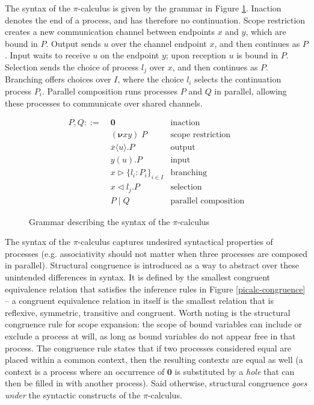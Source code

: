 \documentclass{mproj}
\newcommand{\PO}{\mathbf{0}}
\newcommand{\comp}[2]{#1 \mid #2}
\newcommand{\new}[2]{(\boldsymbol{\nu} #1 #2) \;}
\newcommand{\cout}[2]{\overline{#1}\langle#2\rangle.}
\newcommand{\cin}[2]{#1(#2).}
\newcommand{\select}[2]{#1\triangleleft#2.}
\newcommand{\branch}[2]{#1\triangleright#2}
\newcommand{\picalc}{$\pi$-calculus}
\begin{document}
The syntax of the \picalc{} is given by the grammar in Figure \ref{picalc-syntax}. Inaction denotes the end of a process, and has therefore no continuation. Scope restriction creates a new communication channel between endpoints $x$ and $y$, which are bound in $P$. Output sends $u$ over the channel endpoint $x$, and then continues as $P$. Input waits to receive $u$ on the endpoint $y$; upon reception $u$ is bound in $P$. Selection sends the choice of process $l_j$ over $x$, and then continues as $P$. Branching offers choices over $I$, where the choice $l_i$ selects the continuation process $P_i$. Parallel composition runs processes $P$ and $Q$ in parallel, allowing these processes to communicate over shared channels.

\begin{figure}[H]
    \begin{align*}
    P,Q ::= \; &\PO                      & \text{inaction}             \\
               &\new{x}{y}P              & \text{scope restriction}    \\
               &\cout{x}{u}P             & \text{output}               \\
               &\cin{y}{u}P              & \text{input}                \\
               &\branch{x}
               {\{l_i : P_i\}_{i \in I}} & \text{branching}            \\
               &\select{x}{l_j}P         & \text{selection}            \\
               &\comp{P}{Q}              & \text{parallel composition}
    \end{align*}
    \caption{Grammar describing the syntax of the \picalc{}}
    \label{picalc-syntax}
\end{figure}

The syntax of the \picalc{} captures undesired syntactical properties of processes (e.g. associativity should not matter when three processes are composed in parallel). Structural congruence is introduced as a way to abstract over these unintended differences in syntax. It is defined by the smallest congruent equivalence relation that satisfies the inference rules in Figure \ref{picalc-congruence} -- a congruent equivalence relation in itself is the smallest relation that is reflexive, symmetric, transitive and congruent. Worth noting is the structural congruence rule for scope expansion: the scope of bound variables can include or exclude a process at will, as long as bound variables do not appear free in that process. The congruence rule states that if two processes considered equal are placed within a common context, then the resulting contexts are equal as well (a context is a process where an occurrence of $\PO$ is substituted by a \emph{hole} that can then be filled in with another process). Said otherwise, structural congruence \emph{goes under} the syntactic constructs of the \picalc{}.
\end{document}
